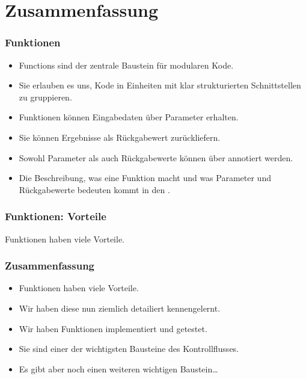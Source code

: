 \documentclass[aspectratio=169,mathserif,notheorems]{beamer}%
\begin{document}
\section{Zusammenfassung}%
%
\begin{frame}%
\frametitle{Funktionen}%
\begin{itemize}%
%
\item Functions sind der zentrale Baustein für modularen Kode.%
%
\item<2-> Sie erlauben es uns, Kode in Einheiten mit klar strukturierten Schnittstellen zu gruppieren.%
%
\item<3-> Funktionen können Eingabedaten über Parameter erhalten.%
%
\item<4-> Sie können Ergebnisse als Rückgabewert zurückliefern.%
%
\item<5-> Sowohl Parameter als auch Rückgabewerte können über  annotiert werden.%
%
\item<6-> Die Beschreibung, was eine Funktion macht und was Parameter und Rückgabewerte bedeuten kommt in den .%
\end{itemize}%
\end{frame}%
%
\begin{frame}%
\frametitle{Funktionen: Vorteile}%
Funktionen haben viele Vorteile.%
%
\end{frame}%
%
\begin{frame}%
\frametitle{Zusammenfassung}%
\begin{itemize}%
%
\item Funktionen haben viele Vorteile.%
%
\item<2-> Wir haben diese nun ziemlich detailiert kennengelernt.%
%
\item<3-> Wir haben Funktionen implementiert und getestet.%
%
\item<4-> Sie sind einer der wichtigsten Bausteine des Kontrollflusses.%
%
\item<5-> Es gibt aber noch einen weiteren wichtigen Baustein\dots%
%
\end{itemize}%
\end{frame}%
%
\endPresentation%
\end{document}
